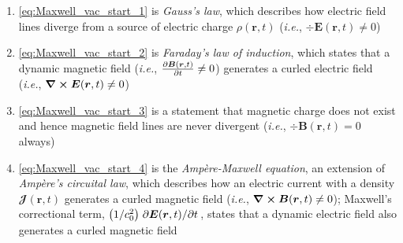 \begin{enumerate}[noitemsep]
	\item \cref{eq:Maxwell_vac_start_1} is \emph{Gauss's law}, which describes how electric field lines diverge from a source of electric charge $\rho(\mathbold{r},t)$ (\emph{i.e.}, $\div \mathbold{E}(\mathbold{r},t) \neq 0$) %
	\item \cref{eq:Maxwell_vac_start_2} is \emph{Faraday's law of induction}, which states that a dynamic magnetic field (\emph{i.e.}, $\pdv{\mathbold{B}(\mathbold{r},t)}{t} \neq 0$) generates a curled electric field (\emph{i.e.}, $\curl \mathbold{E}(\mathbold{r},t) \neq 0$)
	\item \cref{eq:Maxwell_vac_start_3} is a statement that magnetic charge does not exist and hence magnetic field lines are never divergent (\emph{i.e.}, $\div \mathbold{B}(\mathbold{r},t) = 0$ always)
	\item \cref{eq:Maxwell_vac_start_4} is the \emph{Amp\`ere-Maxwell equation}, an extension of \emph{Amp\`ere's circuital law}, which describes how an electric current with a density $\mathbfcal{J}(\mathbold{r},t)$ generates a curled magnetic field (\emph{i.e.}, $\curl \mathbold{B}(\mathbold{r},t) \neq 0$); Maxwell's correctional term, $\left( 1 / c_0^2 \right) \pdv*{\mathbold{E}(\mathbold{r},t)}{t}$, states that a dynamic electric field also generates a curled magnetic field
\end{enumerate}

